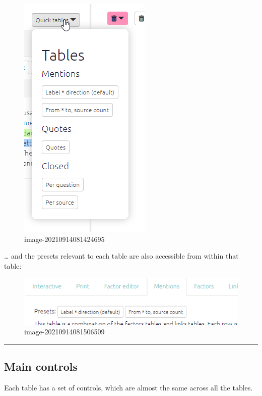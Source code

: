 \documentclass[
]{book}
\begin{document}
\begin{figure}
\centering
\includegraphics{_assets/image-20210914081424695.png}
\caption{image-20210914081424695}
\end{figure}

\ldots{} and the presets relevant to each table are also accessible from within that table:

\begin{figure}
\centering
\includegraphics[width=6.77083in,height=\textheight]{_assets/image-20210914081506509.png}
\caption{image-20210914081506509}
\end{figure}

\begin{center}\rule{0.5\linewidth}{0.5pt}\end{center}

\hypertarget{main-controls}{%
\subsection{Main controls}\label{main-controls}}

Each table has a set of controls, which are almost the same across all the tables.
\end{document}
